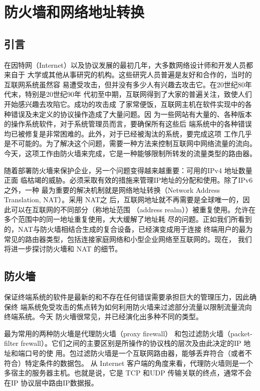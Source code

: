 \chapter{防火墙和网络地址转换}

\section{引言}

在因特网（Internet）以及协议发展的最初几年，大多数网络设计师和开发人员都来自于
大学或其他从事研究的机构。这些研究人员普遍是友好和合作的，当时的互联网系统虽然容
易遭受攻击，但并没有多少人有兴趣去攻击它。在20世纪80年代末，特别是20世纪90年
代初至中期，互联网得到了大家的普遍关注，致使人们开始感兴趣去攻陷它。成功的攻击成
了家常便饭，互联网主机在软件实现中的各种错误及未定义的协议操作造成了大量问题。因
为一些网站有大量的、各种版本的操作系统软件，对于系统管理员而言，要确保所有这些后
端系统中的各种错误均已被修复是非常困难的。此外，对于已经被淘汰的系统，要完成这项
工作几乎是不可能的。为了解决这个问题，需要一种方法来控制互联网中网络流量的流向。
今天，这项工作由防火墙来完成，它是一种能够限制所转发的流量类型的路由器。

随着部署防火墻来保护企业，另一个问题变得越来越重要：可用的IPv4 地址数量正面
临枯竭的威胁。必须采取有效的措施来管理IP地址的分配和使用。除了IPv6之外，一种
最为重要的解决机制就是网络地址转换（Network Address Translation, NAT）。采用 NAT之
后，互联网地址就不再需要是全球唯一的，因此可以在互联网的不同部分（称地址范围
（address realm））被重复使用。允许在多个范围中的同一地址重复使用，大大缓解了地址耗
尽的问题。正如我们所看到的，NAT与防火墙相结合生成的复合设备，已经演变成用于连接
终端用户的最为常见的路由器类型，包括连接家庭网络和小型企业网络至互联网的。现在，
我们将进一步探讨防火墻和 NAT 的细节。

\section{防火墻}

保证终端系统的软件是最新的和不存在任何错误需要承担巨大的管理压力，因此确保终
端系统免受攻击的焦点转为如何利用防火墙来过滤部分流量以限制流量流向终端系统。今天
防火墻很常见，并已经演化出多种不同的类型。

最为常用的两种防火墻是代理防火墙（proxy firewall） 和包过滤防火墙（packet-filter
frewall）。它们之间的主要区别是所操作的协议栈的层次及由此决定的IP 地址和端口号的使
用。包过滤防火墙是一个互联网路由器，能够丢弃符合（或者不符合）特定条件的数据包。
从 Internet 客户端的角度来看，代理防火墙则是一个多宿主的服务器主机。也就是说，它是
TCP 和UDP 传输关联的终点，通常不会在IP 协议层中路由IP数据报。

